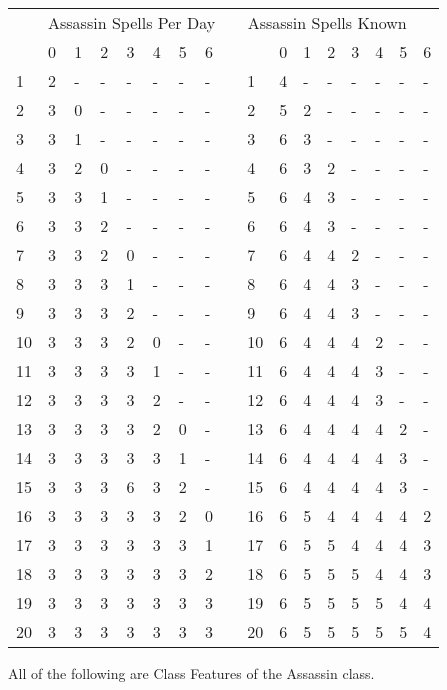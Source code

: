 \documentclass[10pt]{article}
\begin{document}
\begin{floatingfigure}{3.9in}
\begin{small}
\noindent\begin{tabular}{lllllllllllllllll}
 & \multicolumn{7}{c}{Assassin Spells Per Day}  &   &\multicolumn{7}{c}{Assassin Spells Known}\\
  &0 &1 &2 &3 &4 &5 &6 &  &  &0 &1 &2 &3 &4 &5 &6\\
1 &2 &- &- &- &- &- &- &  &1 &4 &- &- &- &- &- &-\\
2 &3 &0 &- &- &- &- &- &  &2 &5 &2 &- &- &- &- &-\\
3 &3 &1 &- &- &- &- &- &  &3 &6 &3 &- &- &- &- &-\\
4 &3 &2 &0 &- &- &- &- &  &4 &6 &3 &2 &- &- &- &-\\
5 &3 &3 &1 &- &- &- &- &  &5 &6 &4 &3 &- &- &- &-\\
6 &3 &3 &2 &- &- &- &- &  &6 &6 &4 &3 &- &- &- &-\\
7 &3 &3 &2 &0 &- &- &- &  &7 &6 &4 &4 &2 &- &- &-\\
8 &3 &3 &3 &1 &- &- &- &  &8 &6 &4 &4 &3 &- &- &-\\
9 &3 &3 &3 &2 &- &- &- &  &9 &6 &4 &4 &3 &- &- &-\\
10 &3 &3 &3 &2 &0 &- &- &  &10 &6 &4 &4 &4 &2 &- &-\\
11 &3 &3 &3 &3 &1 &- &- &  &11 &6 &4 &4 &4 &3 &- &-\\
12 &3 &3 &3 &3 &2 &- &- &  &12 &6 &4 &4 &4 &3 &- &-\\
13 &3 &3 &3 &3 &2 &0 &- &  &13 &6 &4 &4 &4 &4 &2 &-\\
14 &3 &3 &3 &3 &3 &1 &- &  &14 &6 &4 &4 &4 &4 &3 &-\\
15 &3 &3 &3 &6 &3 &2 &- &  &15 &6 &4 &4 &4 &4 &3 &-\\
16 &3 &3 &3 &3 &3 &2 &0 &  &16 &6 &5 &4 &4 &4 &4 &2\\
17 &3 &3 &3 &3 &3 &3 &1 &  &17 &6 &5 &5 &4 &4 &4 &3\\
18 &3 &3 &3 &3 &3 &3 &2 &  &18 &6 &5 &5 &5 &4 &4 &3\\
19 &3 &3 &3 &3 &3 &3 &3 &  &19 &6 &5 &5 &5 &5 &4 &4\\
20 &3 &3 &3 &3 &3 &3 &3 &  &20 &6 &5 &5 &5 &5 &5 &4\\
\end{tabular}
\end{small}
\end{floatingfigure}

\noindent All of the following are Class Features of the Assassin class.
\end{document}
